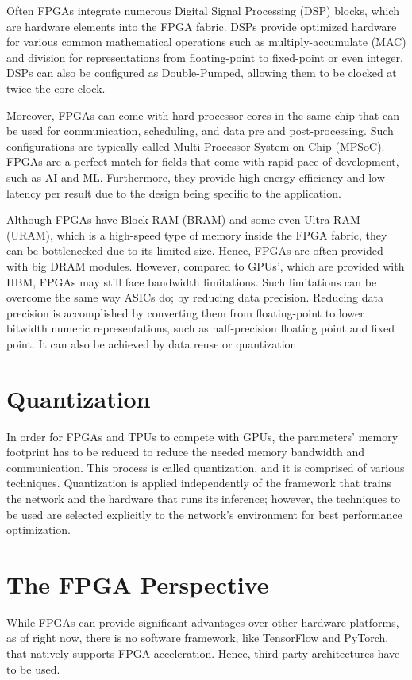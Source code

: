 Often FPGAs integrate numerous Digital Signal Processing (DSP) blocks, which are hardware elements into the FPGA fabric. DSPs provide optimized hardware for various common mathematical operations such as multiply-accumulate (MAC) and division for representations from floating-point to fixed-point or even integer. DSPs can also be configured as Double-Pumped, allowing them to be clocked at twice the core clock.

Moreover, FPGAs can come with hard processor cores in the same chip that can be used for communication, scheduling, and data pre and post-processing. Such configurations are typically called Multi-Processor System on Chip (MPSoC). FPGAs are a perfect match for fields that come with rapid pace of development, such as AI and ML. Furthermore, they provide high energy efficiency and low latency per result due to the design being specific to the application.

Although FPGAs have Block RAM (BRAM) and some even Ultra RAM (URAM), which is a high-speed type of memory inside the FPGA fabric, they can be bottlenecked due to its limited size. Hence, FPGAs are often provided with big DRAM modules. However, compared to GPUs', which are provided with HBM, FPGAs may still face bandwidth limitations. Such limitations can be overcome the same way ASICs do; by reducing data precision. Reducing data precision is accomplished by converting them from floating-point to lower bitwidth numeric representations, such as half-precision floating point and fixed point. It can also be achieved by data reuse or quantization.

\section{Quantization}
In order for FPGAs and TPUs to compete with GPUs, the parameters' memory footprint has to be reduced to reduce the needed memory bandwidth and communication. This process is called quantization, and it is comprised of various techniques. Quantization is applied independently of the framework that trains the network and the hardware that runs its inference; however, the techniques to be used are selected explicitly to the network's environment for best performance optimization.

\section{The FPGA Perspective}
While FPGAs can provide significant advantages over other hardware platforms, as of right now, there is no software framework, like TensorFlow and PyTorch, that natively supports FPGA acceleration. Hence, third party architectures have to be used.

